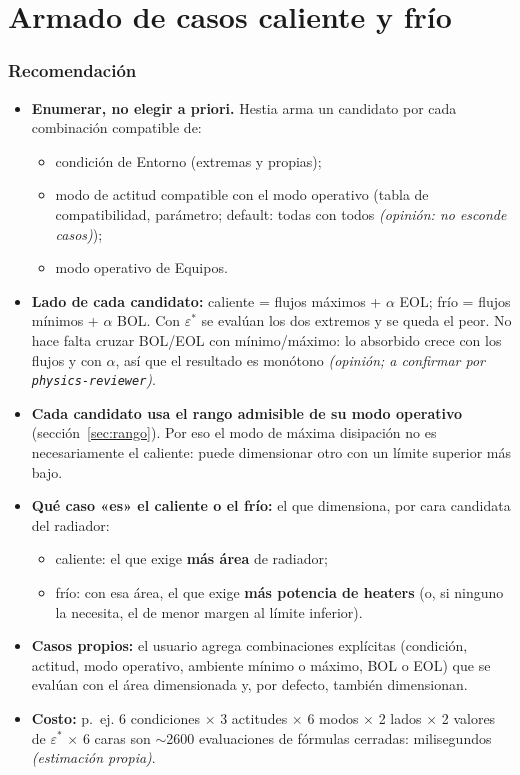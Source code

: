 \documentclass[11pt,a4paper]{article}
\newcommand{\code}[1]{\texttt{#1}}
\newcommand{\op}[1]{\textcolor{opinion}{\textit{(#1)}}}
\begin{document}
\section{Armado de casos caliente y frío}\label{sec:casos}

\subsubsection*{Recomendación}

\begin{itemize}
  \item \textbf{Enumerar, no elegir a priori.} Hestia arma un candidato por cada combinación compatible de:
  \begin{itemize}
    \item condición de Entorno (extremas y propias);
    \item modo de actitud compatible con el modo operativo (tabla de compatibilidad, parámetro; default: todas con todos \op{opinión: no esconde casos});
    \item modo operativo de Equipos.
  \end{itemize}
  \item \textbf{Lado de cada candidato:} caliente = flujos máximos + $\alpha$ EOL; frío = flujos mínimos + $\alpha$ BOL. Con $\varepsilon^*$ se evalúan los dos extremos y se queda el peor. No hace falta cruzar BOL/EOL con mínimo/máximo: lo absorbido crece con los flujos y con $\alpha$, así que el resultado es monótono \op{opinión; a confirmar por \code{physics-reviewer}}.
  \item \textbf{Cada candidato usa el rango admisible de su modo operativo} (sección~\ref{sec:rango}). Por eso el modo de máxima disipación no es necesariamente el caliente: puede dimensionar otro con un límite superior más bajo.
  \item \textbf{Qué caso «es» el caliente o el frío:} el que dimensiona, por cara candidata del radiador:
  \begin{itemize}
    \item caliente: el que exige \textbf{más área} de radiador;
    \item frío: con esa área, el que exige \textbf{más potencia de heaters} (o, si ninguno la necesita, el de menor margen al límite inferior).
  \end{itemize}
  \item \textbf{Casos propios:} el usuario agrega combinaciones explícitas (condición, actitud, modo operativo, ambiente mínimo o máximo, BOL o EOL) que se evalúan con el área dimensionada y, por defecto, también dimensionan.
  \item \textbf{Costo:} p.~ej. 6 condiciones $\times$ 3 actitudes $\times$ 6 modos $\times$ 2 lados $\times$ 2 valores de $\varepsilon^*$ $\times$ 6 caras son $\sim$2600 evaluaciones de fórmulas cerradas: milisegundos \op{estimación propia}.
\end{itemize}
\end{document}
